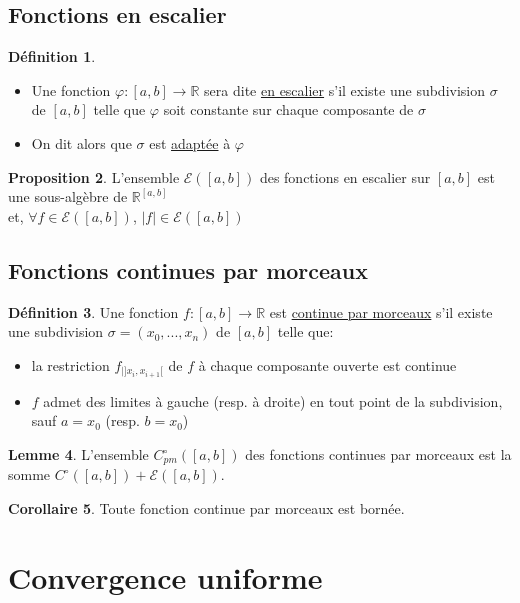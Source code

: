 \documentclass[10pt,a4paper]{article}
\theoremstyle{definition}
\newtheorem{proposition}{Proposition}[section]
\newtheorem{corollaire}[proposition]{Corollaire}
\newtheorem{lemme}[proposition]{Lemme}
\newtheorem{definition}[proposition]{Définition}
\begin{document}
\subsection{Fonctions en escalier}
\begin{definition}
\hfill
\begin{itemize}
\item Une fonction $\varphi: [a, b] \to \mathbb{R}$ sera dite \uline{en escalier} s'il existe une subdivision $\sigma$ de $[a, b]$ telle que $\varphi$ soit constante sur chaque composante de $\sigma$
\item On dit alors que $\sigma$ est \uline{adaptée} à $\varphi$
\end{itemize}
\end{definition}
\begin{proposition}
L'ensemble $\mathcal{E}([a, b])$ des fonctions en escalier sur $[a, b]$ est une sous-algèbre de $\mathbb{R}^{[a, b]}$ \\
et, $\forall f \in \mathcal{E}([a, b])$, $|f| \in \mathcal{E}([a, b])$
\end{proposition}

\subsection{Fonctions continues par morceaux}
\begin{definition}
Une fonction $f: [a,b] \to \mathbb{R}$ est \uline{continue par morceaux} s'il existe une subdivision $\sigma = (x_{0}, ... ,x_{n})$ de $[a, b]$ telle que:
\begin{itemize}
\item la restriction $f_{|]x_{i}, x_{i+1}[}$ de $f$ à chaque composante ouverte est continue
\item $f$ admet des limites à gauche (resp. à droite) en tout point de la subdivision, sauf $a = x_{0}$ (resp. $b = x_{0}$)
\end{itemize}
\end{definition}
\begin{lemme}
L'ensemble $C^{\circ}_{pm}([a, b])$ des fonctions continues par morceaux est la somme $C^{\circ}([a, b]) + \mathcal{E}([a, b])$.
\end{lemme}
\begin{corollaire}
Toute fonction continue par morceaux est bornée.
\end{corollaire}

\section{Convergence uniforme}
\end{document}
